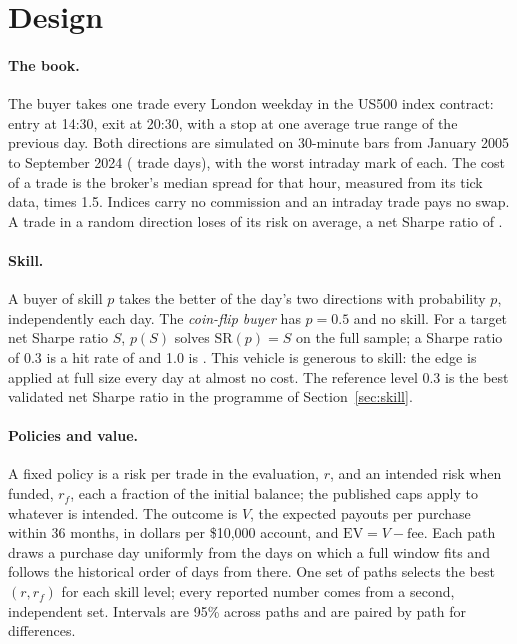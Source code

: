 \documentclass[11pt]{article}
\begin{document}
\section{Design}\label{sec:method}
\paragraph{The book.} The buyer takes one trade every London weekday in the US500 index contract: entry at 14:30,
exit at 20:30, with a stop at one average true range of the previous day. Both directions are simulated on
30-minute bars from January 2005 to September 2024 (\TradeDays{} trade days), with the worst intraday mark of
each. The cost of a trade is the broker's median spread for that hour, measured from its tick data, times 1.5.
Indices carry no commission and an intraday trade pays no swap. A trade in a random direction loses
\CoinCost{} of its risk on average, a net Sharpe ratio of \CoinSharpe{}.

\paragraph{Skill.} A buyer of skill $p$ takes the better of the day's two directions with probability $p$,
independently each day. The \emph{coin-flip buyer} has $p=0.5$ and no skill. For a target net Sharpe ratio $S$,
$p(S)$ solves $\mathrm{SR}(p)=S$ on the full sample; a Sharpe ratio of 0.3 is a hit rate of \HitThree{} and 1.0 is
\HitOne. This vehicle is generous to skill: the edge is applied at full size every day at almost no cost. The
reference level 0.3 is the best validated net Sharpe ratio in the programme of Section~\ref{sec:skill}.

\paragraph{Policies and value.} A fixed policy is a risk per trade in the evaluation, $r$, and an intended risk
when funded, $r_f$, each a fraction of the initial balance; the published caps apply to whatever is intended. The
outcome is $V$, the expected payouts per purchase within 36 months, in dollars per \$10,000 account, and
$\mathrm{EV}=V-\text{fee}$. Each path draws a purchase day uniformly from the days on which a full window fits
and follows the historical order of days from there. One set of \Npaths{} paths selects the best $(r,r_f)$ for
each skill level; every reported number comes from a second, independent set. Intervals are 95\% across paths
and are paired by path for differences.
\end{document}
